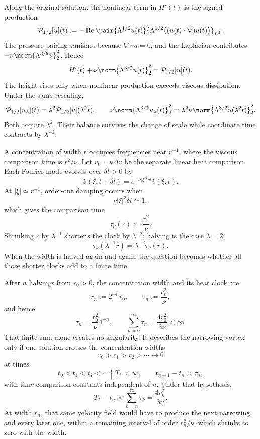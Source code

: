Along the original solution, the nonlinear term in \(H'(t)\) is the signed production
\[
  \mathcal P_{1/2}[u](t)
  :=
  -\operatorname{Re}
  \pair
    {\Lambda^{1/2}u(t)}
    {\Lambda^{1/2}\bigl((u(t)\cdot\nabla)u(t)\bigr)}_{L^2}.
\]
The pressure pairing vanishes because \(\nabla\cdot u=0\), and the Laplacian contributes \(-\nu\norm{\Lambda^{3/2}u}_2^2\). Hence
\[
  H'(t)
  +
  \nu\norm{\Lambda^{3/2}u(t)}_2^2
  =
  \mathcal P_{1/2}[u](t).
\]
The height rises only when nonlinear production exceeds viscous dissipation. Under the same rescaling,
\[
  \mathcal P_{1/2}[u_\lambda](t)
  =
  \lambda^2\mathcal P_{1/2}[u](\lambda^2t),
  \qquad
  \nu\norm{\Lambda^{3/2}u_\lambda(t)}_2^2
  =
  \lambda^2\nu\norm{\Lambda^{3/2}u(\lambda^2t)}_2^2.
\]
Both acquire \(\lambda^2\). Their balance survives the change of scale while coordinate time contracts by \(\lambda^{-2}\).


A concentration of width \(r\) occupies frequencies near \(r^{-1}\), where the viscous comparison time is \(r^2/\nu\). Let \(v_t=\nu\Delta v\) be the separate linear heat comparison. Each Fourier mode evolves over \(\delta t>0\) by
\[
  \widehat v(\xi,t+\delta t)
  =
  e^{-\nu|\xi|^2\delta t}\widehat v(\xi,t).
\]
At \(|\xi|\simeq r^{-1}\), order-one damping occurs when
\[
  \nu|\xi|^2\delta t\simeq1,
\]
which gives the comparison time
\[
  \tau_\nu(r)
  :=
  \frac{r^2}{\nu}.
\]
Shrinking \(r\) by \(\lambda^{-1}\) shortens the clock by \(\lambda^{-2}\); halving is the case \(\lambda=2\):
\[
  \tau_\nu(\lambda^{-1}r)
  =
  \lambda^{-2}\tau_\nu(r).
\]
When the width is halved again and again, the question becomes whether all those shorter clocks add to a finite time.


After \(n\) halvings from \(r_0>0\), the concentration width and its heat clock are
\[
  r_n:=2^{-n}r_0,
  \qquad
  \tau_n:=\frac{r_n^2}{\nu},
\]
and hence
\[
  \tau_n
  =
  \frac{r_0^2}{\nu}4^{-n},
  \qquad
  \sum_{n=0}^{\infty}\tau_n
  =
  \frac{4r_0^2}{3\nu}
  <
  \infty.
\]
That finite sum alone creates no singularity. It describes the narrowing vortex only if one \NavierStokes{} solution crosses the concentration widths
\[
  r_0>r_1>r_2>\cdots\longrightarrow0
\]
at times
\[
  t_0<t_1<t_2<\cdots\uparrow T_*<\infty,
  \qquad
  t_{n+1}-t_n\asymp\tau_n,
\]
with time-comparison constants independent of \(n\). Under that hypothesis,
\[
  T_*-t_n
  \asymp
  \sum_{k=n}^{\infty}\tau_k
  =
  \frac{4r_n^2}{3\nu}.
\]
At width \(r_n\), that same velocity field would have to produce the next narrowing, and every later one, within a remaining interval of order \(r_n^2/\nu\), which shrinks to zero with the width.
